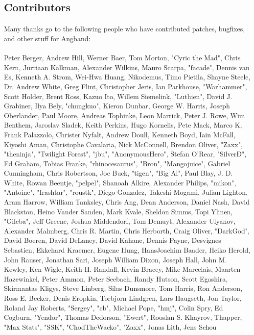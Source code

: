 \subsection{Contributors}
\paragraph{}
Many thanks go to the following people who have contributed patches,
bugfixes, and other stuff for Angband:

\paragraph{}
Peter Berger, Andrew Hill, Werner Baer, Tom Morton, "Cyric the Mad", 
Chris Kern, Jurriaan Kalkman, Alexander Wilkins, Mauro Scarpa, "facade", 
Dennis van Es, Kenneth A. Strom, Wei-Hwa Huang, Nikodemus, Timo Pietila, 
Shayne Steele, Dr. Andrew White, Greg Flint, Christopher Jeris, Ian 
Parkhouse, "Warhammer", Scott Holder, Brent Ross, Kazuo Ito, Willem 
Siemelink, "Luthien", David J. Grabiner, Ilya Bely, "chungkuo", Kieron 
Dunbar, George W. Harris, Joseph Oberlander, Paul Moore, Andreas 
Tophinke, Leon Marrick, Peter J. Rowe, Wim Benthem, Jaroslav Sladek, 
Keith Perkins, Hugo Kornelis, Pete Mack, Marco K, Frank Palazzolo, 
Christer Nyfalt, Andrew Doull, Kenneth Boyd, Iain McFall, Kiyoshi Aman, 
Christophe Cavalaria, Nick McConnell, Brendon Oliver, "Zaxx", 
"theninja", "Twilight Forest", "jbu", "AnonymousHero", Stefan O'Rear, 
"SilverD", Ed Graham, Tobias Franke, "rhinocesaurus", "Bron", "Mangojuice", 
Gabriel Cunningham, Chris Robertson, Joe Buck, "tigen", "Big Al", Paul 
Blay, J. D. White, Rowan Beentje, "pelpel", Shanoah Alkire, Alexander 
Philips, "mikon", "Antoine", "Irashtar", "roustk", Diego Gonzalez, 
Takeshi Mogami, Julian Lighton, Aram Harrow, William Tanksley, Chris 
Ang, Dean Anderson, Daniel Nash, David Blackston, Heino Vander Sanden, 
Mark Kvale, Sheldon Simms, Topi Ylinen, "Gileba", Jeff Greene, Joshua 
Middendorf, Tom Demuyt, Alexander Ulyanov, Alexander Malmberg, Chris R. 
Martin, Chris Herborth, Craig Oliver, "DarkGod", David Boeren, David 
DeLaney, David Kahane, Dennis Payne, Desvignes Sebastien, Ekkehard 
Kraemer, Eugene Hung, HansJoachim Baader, Heiko Herold, John Rauser, 
Jonathan Sari, Joseph William Dixon, Joseph Hall, John M. Kewley, Ken 
Wigle, Keith H. Randall, Kevin Bracey, Mike Marcelais, Maarten 
Hazewinkel, Peter Ammon, Peter Seebach, Randy Hutson, Scott Egashira, 
Skirmantas Kligys, Steve Linberg, Silas Dunsmore, Tom Harris, Ron 
Anderson, Ross E. Becker, Denis Eropkin, Torbjorn Lindgren, Lars 
Haugseth, Jon Taylor, Roland Jay Roberts, "Sergey", "cb", Michael Pope, 
"hmj", Colin Spry, Ed Cogburn, "Yendor", Thomas Dedorson, "Ewert",
Rooslan S. Khayrov, Thapper, "Max Stats", "SSK", "ChodTheWacko", "Zaxx",
Jonas Lith, Jens Schou

